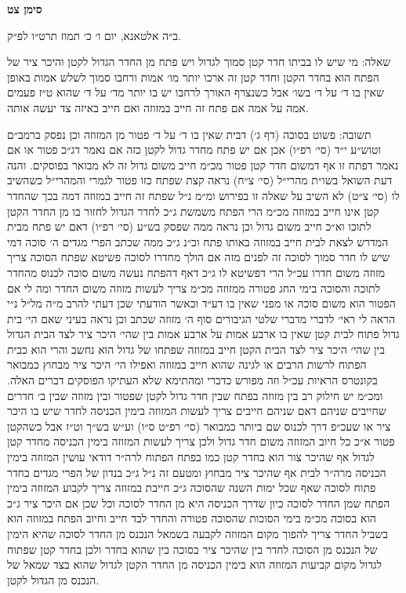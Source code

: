 \documentclass[12pt, openany]{book}
\newcommand{\chapname}{}
\newcommand{\newchap}[1]{
	\addcontentsline{toc}{chapter}{#1}
	\renewcommand{\chapname}{#1}
		\begin{center}
			\textbf{%
\fontsize{16pt}{16pt}\selectfont
				#1}
		\end{center}
}
\begin{document}
\newchap{סימן צט}
\begin{multicols}{2}
ב״ה אלטאנא, יום ו׳ כ׳ תמוז תרט״ו לפ״ק.\\\vspace{0pt}

שאלה: מי שיש לו בביתו חדר קטן סמוך לגדול ויש פתח מן החדר הגדול לקטן והיכר ציר של הפתח הוא בחדר הקטן וחדר קטן זה ארכו יותר מו׳ אמות ורחבו סמוך לשלש אמות באופן שאין בו ד׳ על ד׳ בשו׳ אבל כשנצרף האורך לרחבו יש בו יותר מד׳ על ד׳ שהוא ט״ז פעמים אמה על אמה אם פתח זה חייב במזוזה ואם חייב באיזה צד יעשה אותה.\\\vspace{0pt}

תשובה: פשוט בסוכה (דף ג׳) דבית שאין בו ד׳ על ד׳ פטור מן המזוזה וכן נפסק ברמב״ם וטוש״ע י״ד (סי׳ רפ״ו) אכן אם יש פתח מחדר גדול לקטן כזה אם נאמר דג״כ פטור או אם נאמר דפתח זו אף דמשום חדר קטן פטור מכ״מ חייב משום גדול זה לא מבואר בפוסקים. והנה דעת השואל בשו״ת מהרי״ל (סי׳ צ״ח) נראה קצת שפתח כזו פטור לגמרי והמהרי״ל כשהשיב לו (סי׳ צ״ט) לא השיב על שאלה זו בפירוש ומ״מ נ״ל שפתח זה חייב במזוזה דמה בכך שהחדר קטן אינו חייב במזוזה מכ״מ הרי הפתח משמשת ג״כ לחדר הגדול לחזור בו מן החדר הקטן לתוכו וא״כ חייב משום גדול וכן נראה ממה שפסק בש״ע (סי׳ רפ״ו) דאם יש פתח מבית המדרש לצאת לבית חייב במזוזה באותו פתח וכ״נ ג״כ ממה שכתב הפרי מגדים ה׳ סוכה דמי שיש לו חדר סמוך לסוכה זה לפנים מזה אם הולך מחדרו לסוכה פשיטא שפתח הסוכה צריך מזוזה משום חדרו עכ״ל הרי דפשיטא לו ג״כ דאף דהפתח נעשה משום סוכה לכנוס מהחדר לתוכה והסוכה בימי החג פטורה ממזוזה מכ״מ צריך לעשות מזוזה משום החדר ומה לי אם הפטור הוא משום סוכה או מפני שאין בו דע״ד וכאשר הודעתי שכן דעתי להרב מ״ה מל״ל נ״י הראה לי ראי׳ לדברי מדברי שלטי הגיבורים סוף ה׳ מזוזה שכתב וכן נראה בעיני שאם הי׳ בית גדול פתוח לבית קטן שאין בו ארבע אמות על ארבע אמות בין שהי׳ היכר ציר לצד הבית הגדול בין שהי׳ היכר ציר לצד הבית הקטן חייב במזוזה שפתחו של גדול הוא נחשב והרי הוא כבית הפתוח לרשות הרבים או לגינה שהוא חייב במזוזה ואפילו הי׳ היכר ציר מבחוץ כמבואר בקונטרס הראיות עכ״ל וזה מפורש כדברי ומהתימא שלא העתיקו הפוסקים דברים האלה. ומכ״מ יש חילוק רב בין מזוזה בפתח שבין חדר גדול לקטן שפטור ובין מזוזה שבין ב׳ חדרים שחייבים שניהם דאם שניהם חייבים צריך לעשות המזוזה בימין הכניסה לחדר שיש בו היכר ציר או שעכ״פ דרך לכנוס שם ביותר כמבואר (סי׳ רפ״ט ס״ו) וע״ש בש״ך וט״ז אבל כשהקטן פטור א״כ כל חיוב המזוזה משום חדר גדול ולכן צריך לעשות המזוזה בימין הכניסה מחדר קטן לגדול אף שהיכר צור הוא בחדר קטן כמו בפתח הפתוח לרה״ר דודאי עושין המזוזה בימין הכניסה מרה״ר לבית אף שהיכר ציר מבחוץ ומטעם זה נ״ל ג״כ בנדון של הפרי מגדים בחדר פתוח לסוכה שאף שכל ימות השנה שהסוכה ג״כ חייבת במזוזה צריך לקבוע המזוזה בימין הפתח שמן החדר לסוכה כיון שדרך הכניסה היא מן החדר לסוכה וכל שכן אם היכר ציר ג״כ הוא בסוכה מכ״מ בימי הסוכות שהסוכה פטורה והחדר לבד חייב וחיוב הפתח במזוזה הוא בשביל החדר צריך להפוך מקום המזוזה לקבעה בשמאל הנכנס מן החדר לסוכה שהיא הימין של הנכנס מן הסוכה לחדר בין שהיכר ציר בסוכה בין שהוא בחדר ולכן בחדר קטן שפתוח לגדול מקום קביעות המזוזה הוא בימין הכניסה מן החדר הקטן לגדול שהוא בצד שמאל של הנכנס מן הגדול לקטן.\\\vspace{0pt}


\end{multicols}
\end{document}
